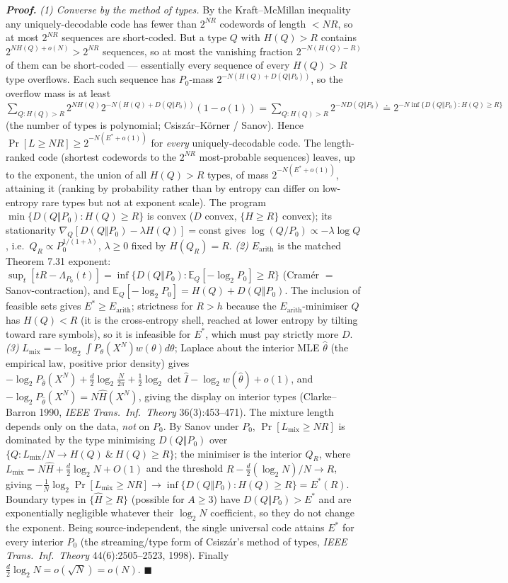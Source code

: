 \documentclass[
]{article}
\begin{document}
\emph{\textbf{Proof.}} \emph{(1) Converse by the method of types.} By the
Kraft--McMillan inequality any uniquely-decodable code has fewer than $2^{NR}$
codewords of length $<NR$, so at most $2^{NR}$ sequences are short-coded. But a type
$Q$ with $H(Q)>R$ contains $2^{N H(Q)+o(N)}>2^{NR}$ sequences, so at most the
vanishing fraction $2^{-N(H(Q)-R)}$ of them can be short-coded --- essentially every
sequence of every $H(Q)>R$ type overflows. Each such sequence has $P_0$-mass
$2^{-N(H(Q)+D(Q\Vert P_0))}$, so the overflow mass is at least
$\sum_{Q:H(Q)>R}2^{N H(Q)}2^{-N(H(Q)+D(Q\Vert P_0))}(1-o(1))=\sum_{Q:H(Q)>R}
2^{-N D(Q\Vert P_0)}\doteq 2^{-N\inf\{D(Q\Vert P_0):H(Q)\ge R\}}$ (the number of
types is polynomial; Csisz\'ar--K\"orner / Sanov). Hence $\Pr[L\ge NR]\ge
2^{-N(E^\ast+o(1))}$ for \emph{every} uniquely-decodable code. The length-ranked
code (shortest codewords to the $2^{NR}$ most-probable sequences) leaves, up to the
exponent, the union of all $H(Q)>R$ types, of mass $2^{-N(E^\ast+o(1))}$, attaining
it (ranking by probability rather than by entropy can differ on low-entropy rare
types but not at exponent scale).
The program $\min\{D(Q\Vert P_0):H(Q)\ge R\}$ is convex ($D$ convex, $\{H\ge R\}$
convex); its stationarity $\nabla_Q[D(Q\Vert P_0)-\lambda H(Q)]=\mathrm{const}$
gives $\log(Q/P_0)\propto -\lambda\log Q$, i.e.\ $Q_R\propto P_0^{1/(1+\lambda)}$,
$\lambda\ge0$ fixed by $H(Q_R)=R$. \emph{(2)} $E_{\mathrm{arith}}$ is the matched
Theorem 7.31 exponent: $\sup_{t}[tR-\Lambda_{P_0}(t)]=\inf\{D(Q\Vert P_0):\mathbb
E_Q[-\log_2 P_0]\ge R\}$ (Cram\'er $=$ Sanov-contraction), and $\mathbb E_Q[-\log_2
P_0]=H(Q)+D(Q\Vert P_0)$. The inclusion of feasible sets gives $E^\ast\ge
E_{\mathrm{arith}}$; strictness for $R>h$ because the $E_{\mathrm{arith}}$-minimiser
$Q$ has $H(Q)<R$ (it is the cross-entropy shell, reached at lower entropy by tilting
toward rare symbols), so it is infeasible for $E^\ast$, which must pay strictly more
$D$. \emph{(3)} $L_{\mathrm{mix}}=-\log_2\int P_\theta(X^N)w(\theta)d\theta$; Laplace
about the interior MLE $\hat\theta$ (the empirical law, positive prior density)
gives $-\log_2 P_{\hat\theta}(X^N)+\tfrac d2\log_2\tfrac{N}{2\pi}+\tfrac12\log_2\det
\hat I-\log_2 w(\hat\theta)+o(1)$, and $-\log_2 P_{\hat\theta}(X^N)=N\widehat
H(X^N)$, giving the display on interior types (Clarke--Barron 1990, \emph{IEEE
Trans.\ Inf.\ Theory} 36(3):453--471). The mixture length depends only on the data,
\emph{not} on $P_0$. By Sanov under $P_0$, $\Pr[L_{\mathrm{mix}}\ge NR]$ is dominated
by the type minimising $D(Q\Vert P_0)$ over $\{Q:L_{\mathrm{mix}}/N\to H(Q)\ \&\
H(Q)\ge R\}$; the minimiser is the interior $Q_R$, where $L_{\mathrm{mix}}=N\widehat
H+\tfrac d2\log_2 N+O(1)$ and the threshold $R-\tfrac d2(\log_2 N)/N\to R$, giving
$-\tfrac1N\log_2\Pr[L_{\mathrm{mix}}\ge NR]\to\inf\{D(Q\Vert P_0):H(Q)\ge R\}=
E^\ast(R)$. Boundary types in $\{\widehat H\ge R\}$ (possible for $A\ge3$) have
$D(Q\Vert P_0)>E^\ast$ and are exponentially negligible whatever their $\log_2 N$
coefficient, so they do not change the exponent. Being source-independent, the single
universal code attains $E^\ast$ for every interior $P_0$ (the streaming/type form of
Csisz\'ar's method of types, \emph{IEEE Trans.\ Inf.\ Theory} 44(6):2505--2523,
1998). Finally $\tfrac d2\log_2 N=o(\sqrt N)=o(N)$. \hfill$\blacksquare$
\end{document}
